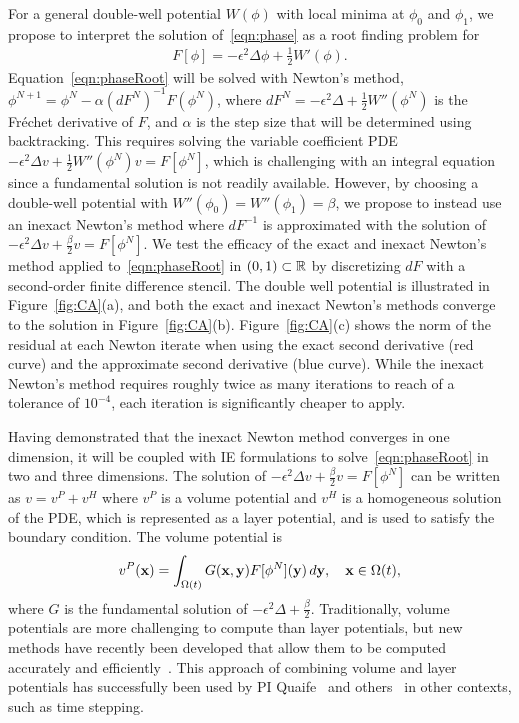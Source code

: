 For a general double-well potential $W(\phi)$ with local minima at
$\phi_0$ and $\phi_1$, we propose to interpret the solution
of~\eqref{eqn:phase} as a root finding problem for
\begin{align}
  \label{eqn:phaseRoot}
  F[\phi] = -\epsilon^2 \Delta \phi + \tfrac{1}{2}W'(\phi).
\end{align}
Equation~\eqref{eqn:phaseRoot} will be solved with Newton's method,
$\phi^{N+1} = \phi^{N} - \alpha (dF^N)^{-1} F(\phi^N)$, where $dF^N =
-\epsilon^2 \Delta + \tfrac{1}{2}W''(\phi^N)$ is the Fr\'{e}chet
derivative of $F$, and $\alpha$ is the step size that will be determined
using backtracking. This requires solving the variable coefficient PDE
$-\epsilon^2 \Delta v + \tfrac{1}{2}W''(\phi^{N}) v = F[\phi^N]$, which
is challenging with an integral equation since a fundamental solution is
not readily available. However, by choosing a double-well potential with
$W''(\phi_0) = W''(\phi_1) = \beta$, we propose to instead use an
inexact Newton's method where $dF^{-1}$ is approximated with the
solution of $-\epsilon^2 \Delta v + \tfrac{\beta}{2} v = F[\phi^N]$. We
test the efficacy of the exact and inexact Newton's method applied
to~\eqref{eqn:phaseRoot} in $(0,1) \subset \mathbb{R}$ by discretizing $dF$
with a second-order finite difference stencil. The double well potential
is illustrated in Figure~\ref{fig:CA}(a), and both the exact and inexact
Newton's methods converge to the solution in Figure~\ref{fig:CA}(b).
Figure~\ref{fig:CA}(c) shows the norm of the residual at each Newton
iterate when using the exact second derivative (red curve) and the
approximate second derivative (blue curve). While the inexact Newton's
method requires roughly twice as many iterations to reach of a tolerance
of $10^{-4}$, each iteration is significantly cheaper to apply.

Having demonstrated that the inexact Newton method converges in one
dimension, it will be coupled with IE formulations to
solve~\eqref{eqn:phaseRoot} in two and three dimensions. The solution of
$-\epsilon^2 \Delta v + \tfrac{\beta}{2} v = F[\phi^N]$ can be written
as $v = v^P + v^H$ where $v^P$ is a volume potential and $v^H$ is a
homogeneous solution of the PDE, which is represented as a layer
potential, and is used to satisfy the boundary condition. The volume
potential is
\begin{align*}
  v^{P}(\mathbf{x}) = \int_{\Omega(t)} G(\mathbf{x},\mathbf{y}) F[\phi^N](\mathbf{y})\, d\mathbf{y}, 
    \quad \mathbf{x} \in \Omega(t),
\end{align*}
where $G$ is the fundamental solution of $-\epsilon^2 \Delta +
\tfrac{\beta}{2}$. Traditionally, volume potentials are more challenging
to compute than layer potentials, but new methods have recently been
developed that allow them to be computed accurately and
efficiently~\cite{fry-leh-tor2018, and-zhu-vee2022}. This approach of
combining volume and layer potentials has successfully been used by PI
Quaife~\cite{kro-qua2010} and others~\cite{fry-kro-tor2019,
kli-ask-kro2020, che-hua-lei2005} in other contexts, such as time
stepping.

